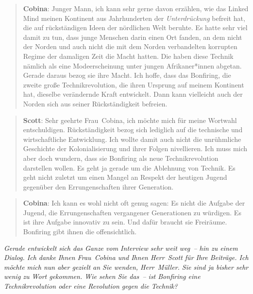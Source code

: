\documentclass{scrartcl}
\newenvironment{frage}{\itshape}{}
\newenvironment{antworta}{
  \begin{quotation}
  }{
  \end{quotation}
}
\newenvironment{antwortb}{
  \begin{quotation}
  }{
  \end{quotation}
}
\newcommand{\name}[1]{\textbf{#1}}
\begin{document}
\begin{antwortb}
\name{Cobina}: Junger Mann, ich kann sehr gerne davon erzählen, wie
das Linked Mind meinen Kontinent aus Jahrhunderten der
\emph{Unterdrückung} befreit hat, die auf rückständigen Ideen der
nördlichen Welt beruhte. Es hatte sehr viel damit zu tun,
dass junge Menschen darin einen Ort fanden, an dem nicht der
Norden und auch nicht die mit dem Norden verbandelten
korrupten Regime der damaligen Zeit die Macht hatten. Die
haben diese Technik nämlich als eine Modeerscheinung unter
jungen Afrikaner*innen abgetan. Gerade daraus bezog sie ihre
Macht. Ich hoffe, dass das Bonfiring, die zweite große
Technikrevolution, die ihren Ursprung auf meinem Kontinent
hat, dieselbe verändernde Kraft entwickelt. Dann kann
vielleicht auch der Norden sich aus seiner Rückständigkeit
befreien.
\end{antwortb}


\begin{antworta}
\name{Scott}: Sehr geehrte Frau~Cobina, ich möchte mich für meine
Wortwahl entschuldigen. Rückständigkeit bezog sich lediglich
auf die technische und wirtschaftliche Entwicklung. Ich
wollte damit auch nicht die unrühmliche Geschichte der
Kolonialisierung und ihrer Folgen nivellieren. Ich muss mich
aber doch wundern, dass sie Bonfiring als neue
Technikrevolution darstellen wollen. Es geht ja gerade um
die Ablehnung von Technik. Es geht nicht zuletzt um einen
Mangel an Respekt der heutigen Jugend gegenüber den
Errungenschaften ihrer Generation.
\end{antworta}


\begin{antwortb}
\name{Cobina}: Ich kann es wohl nicht oft genug sagen: Es nicht die
Aufgabe der Jugend, die Errungenschaften vergangener
Generationen zu würdigen. Es ist ihre Aufgabe innovativ zu
sein. Und dafür braucht sie Freiräume. Bonfiring gibt ihnen
die offensichtlich.
\end{antwortb}


\begin{frage}
Gerade entwickelt sich das Ganze vom Interview sehr weit weg~– hin zu einem Dialog. Ich danke Ihnen Frau~Cobina und Ihnen
Herr~Scott für Ihre Beiträge. Ich möchte mich nun aber
gezielt an Sie wenden, Herr~Müller. Sie sind ja bisher sehr
wenig zu Wort gekommen. Wie sehen Sie das~– ist Bonfiring
eine Technikrevolution oder eine Revolution gegen die
Technik?
\end{frage}
\end{document}
